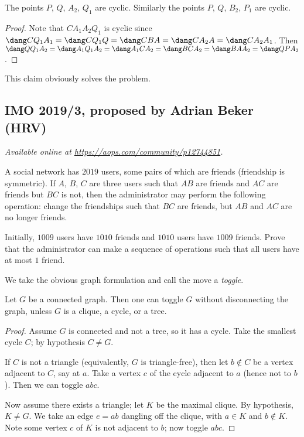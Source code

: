 \documentclass[11pt]{scrartcl}
\begin{document}
\begin{claim*}
  The points $P$, $Q$, $A_2$, $Q_1$ are cyclic.
  Similarly the points $P$, $Q$, $B_2$, $P_1$ are cyclic.
\end{claim*}
\begin{proof}
  Note that $CA_1A_2Q_1$ is cyclic since
  $\dang CQ_1A_1 = \dang CQ_1Q = \dang CBA = \dang CA_2A = \dang CA_2A_1$.
  Then $\dang QQ_1A_2 = \dang A_1Q_1A_2 = \dang A_1 C A_2
  = \dang B C A_2 = \dang B A A_2 = \dang Q P A_2$.
\end{proof}

This claim obviously solves the problem.
\pagebreak

\subsection{IMO 2019/3, proposed by Adrian Beker (HRV)}
\textsl{Available online at \url{https://aops.com/community/p12744851}.}
\begin{mdframed}[style=mdpurplebox,frametitle={Problem statement}]
A social network has $2019$ users, some pairs of which are friends (friendship is symmetric).
If $A$, $B$, $C$ are three users such that $AB$ are friends and $AC$ are friends but $BC$ is not,
then the administrator may perform the following operation:
change the friendships such that $BC$ are friends, but $AB$ and $AC$ are no longer friends.

Initially, $1009$ users have $1010$ friends and $1010$ users have $1009$ friends.
Prove that the administrator can make a sequence of operations
such that all users have at most $1$ friend.
\end{mdframed}
We take the obvious graph formulation
and call the move a \emph{toggle}.

\begin{claim*}
  Let $G$ be a connected graph.
  Then one can toggle $G$ without disconnecting the graph,
  unless $G$ is a clique, a cycle, or a tree.
\end{claim*}
\begin{proof}
  Assume $G$ is connected and not a tree, so it has a cycle.
  Take the smallest cycle $C$; by hypothesis $C \neq G$.

  If $C$ is not a triangle (equivalently, $G$ is triangle-free),
  then let $b \notin C$ be a vertex adjacent to $C$, say at $a$.
  Take a vertex $c$ of the cycle adjacent to $a$ (hence not to $b$).
  Then we can toggle $abc$.

  Now assume there exists a triangle; let $K$ be the maximal clique.
  By hypothesis, $K \neq G$.
  We take an edge $e = ab$ dangling off the clique,
  with $a \in K$ and $b \notin K$.
  Note some vertex $c$ of $K$ is not adjacent to $b$; now toggle $abc$.
\end{proof}
\end{document}
